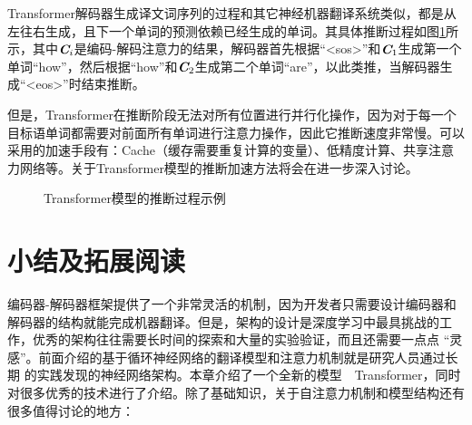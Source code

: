 \parinterval Transformer解码器生成译文词序列的过程和其它神经机器翻译系统类似，都是从左往右生成，且下一个单词的预测依赖已经生成的单词。其具体推断过程如图\ref{fig:12-19}所示，其中$\textbf{\em C}_i$是编码-解码注意力的结果，解码器首先根据“<sos>”和$\textbf{\em C}_1$生成第一个单词“how”，然后根据“how”和$\textbf{\em C}_2$生成第二个单词“are”，以此类推，当解码器生成“<eos>”时结束推断。

\parinterval 但是，Transformer在推断阶段无法对所有位置进行并行化操作，因为对于每一个目标语单词都需要对前面所有单词进行注意力操作，因此它推断速度非常慢。可以采用的加速手段有：Cache（缓存需要重复计算的变量）、低精度计算、共享注意力网络等。关于Transformer模型的推断加速方法将会在{\chapterfourteen}进一步深入讨论。

\begin{figure}[htp]
\centering

\caption{Transformer模型的推断过程示例}
\label{fig:12-19}
\end{figure}



\sectionnewpage
\section{小结及拓展阅读}

\parinterval 编码器­-解码器框架提供了一个非常灵活的机制，因为开发者只需要设计编码器和解码器的结构就能完成机器翻译。但是，架构的设计是深度学习中最具挑战的工
作，优秀的架构往往需要长时间的探索和大量的实验验证，而且还需要一点点 “灵感”。前面介绍的基于循环神经网络的翻译模型和注意力机制就是研究人员通过长期
的实践发现的神经网络架构。本章介绍了一个全新的模型\ \dash \ Transformer，同时对很多优秀的技术进行了介绍。除了基础知识，关于自注意力机制和模型结构还有很多值得讨论的地方：

